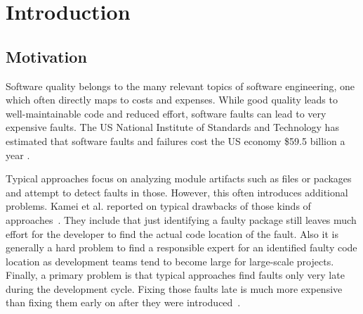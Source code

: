 \section{Introduction}
\label{sec:intro}

\subsection{Motivation}

Software quality belongs to the many relevant topics of software engineering, one which often directly maps to costs and expenses. While good quality leads to well-maintainable code and reduced effort, software faults can lead to very expensive faults. The US National Institute of Standards and Technology has estimated that software faults and failures cost the US economy \$59.5 billion a year \cite{nist,Rosen2015}.

Typical approaches focus on analyzing module artifacts such as files or packages and attempt to detect faults in those. However, this often introduces additional problems.
Kamei et al. reported on typical drawbacks of those kinds of approaches~\cite{Kamei2013}. They include that just identifying a faulty package still leaves much effort for the developer to find the actual code location of the fault. Also it is generally a hard problem to find a responsible expert for an identified faulty code location as development teams tend to become large for large-scale projects.
Finally, a primary problem is that typical approaches find faults only very late during the development cycle. Fixing those faults late is much more expensive than fixing them early on after they were introduced~\cite{Martin08}.

